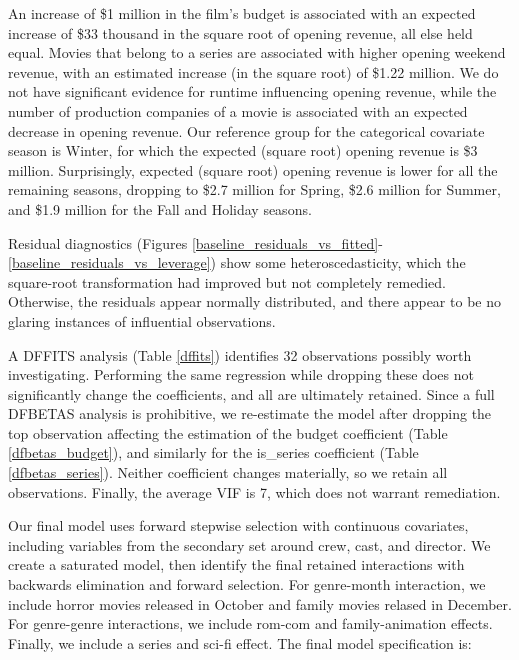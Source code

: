 \documentclass[10pt]{article}
\begin{document}
An increase of \$1 million in the film’s budget is associated with an expected increase of \$33 thousand in the square root of opening revenue, all else held equal. Movies that belong to a series are associated with higher opening weekend revenue, with an estimated increase (in the square root) of \$1.22 million. We do not have significant evidence for runtime influencing opening revenue, while the number of production companies of a movie is associated with an expected decrease in opening revenue. 
Our reference group for the categorical covariate season is Winter, for which the expected (square root) opening revenue is \$3 million. Surprisingly, expected (square root) opening revenue is lower for all the remaining seasons, dropping to \$2.7 million for Spring, \$2.6 million for Summer, and \$1.9 million for the Fall and Holiday seasons. 

Residual diagnostics (Figures \ref{baseline_residuals_vs_fitted}-\ref{baseline_residuals_vs_leverage}) show some heteroscedasticity, which the square-root transformation had improved but not completely remedied. Otherwise, the residuals appear normally distributed, and there appear to be no glaring instances of influential observations.

A DFFITS analysis (Table \ref{dffits}) identifies 32 observations possibly worth investigating. Performing the same regression while dropping these does not significantly change the coefficients, and all are ultimately retained. Since a full DFBETAS analysis is prohibitive, we re-estimate the model after dropping the top observation affecting the estimation of the budget coefficient (Table \ref{dfbetas_budget}), and similarly for the is\_series coefficient (Table \ref{dfbetas_series}). Neither coefficient changes materially, so we retain all observations. Finally, the average VIF is 7, which does not warrant remediation.

Our final model uses forward stepwise selection with continuous covariates, including variables from the secondary set around crew, cast, and director. We create a saturated model, then identify the final retained interactions with backwards elimination and forward selection. For genre-month interaction, we include horror movies released in October and family movies relased in December. For genre-genre interactions, we include rom-com and family-animation effects. Finally, we include a series and sci-fi effect. The final model specification is:
\end{document}
